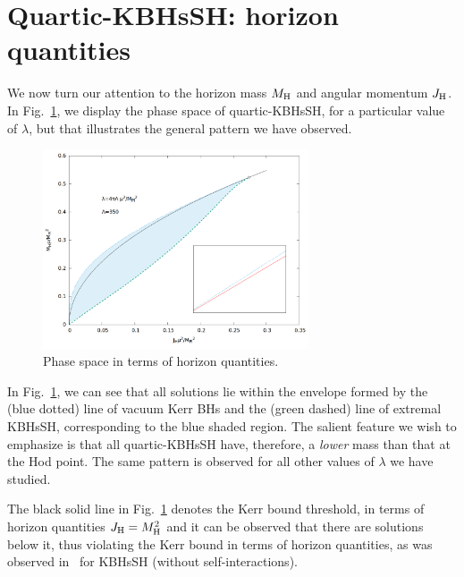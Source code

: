 \section{Quartic-KBHsSH: horizon quantities}
\label{sec_IV}

 
We now turn our attention to the horizon mass $M_{\rm H}$ and angular momentum $J_{\rm H}$. In Fig.~\ref{horizon_phase}, we display the phase space of quartic-KBHsSH, for a particular value of $\lambda$, but that illustrates the general pattern we have observed. 


\begin{figure}[h!]
  \begin{center}
    \includegraphics[width=0.7\textwidth]{papers/selfInteractions/horizon-quantities.png}
      \end{center}
  \caption{Phase space in terms of horizon quantities.}
  \label{horizon_phase}
\end{figure}

In Fig.~\ref{horizon_phase}, we can see that all solutions lie within the envelope formed by the (blue dotted) line of vacuum Kerr BHs and the (green dashed) line of extremal KBHsSH, corresponding to the blue shaded region. The salient feature we wish to emphasize is that all quartic-KBHsSH have, therefore, a \textit{lower} mass than that at the Hod point. The same pattern is observed for all other values of $\lambda$ we have studied. 


The black solid line in Fig.~\ref{horizon_phase} denotes the Kerr bound threshold, in terms of horizon quantities $J_{\rm H}=M_{\rm H}^2$ and it can be observed that there are solutions below it, thus violating the Kerr bound in terms of horizon quantities, as was observed in~\cite{Herdeiro:2015moa} for KBHsSH (without self-interactions). 

